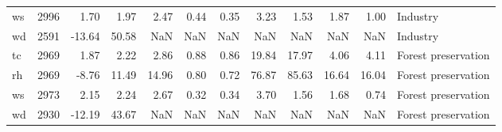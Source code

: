\begin{table}
\begin{tabular}{lrrrrrrrrrrl}
ws &   2996 &   1.70 &   1.97 &   2.47 &  0.44 &  0.35 &   3.23 &   1.53 &   1.87 &   1.00 &             Industry \\
wd &   2591 & -13.64 &  50.58 &    NaN &   NaN &   NaN &    NaN &    NaN &    NaN &    NaN &             Industry \\
tc &   2969 &   1.87 &   2.22 &   2.86 &  0.88 &  0.86 &  19.84 &  17.97 &   4.06 &   4.11 &  Forest preservation \\
rh &   2969 &  -8.76 &  11.49 &  14.96 &  0.80 &  0.72 &  76.87 &  85.63 &  16.64 &  16.04 &  Forest preservation \\
ws &   2973 &   2.15 &   2.24 &   2.67 &  0.32 &  0.34 &   3.70 &   1.56 &   1.68 &   0.74 &  Forest preservation \\
wd &   2930 & -12.19 &  43.67 &    NaN &   NaN &   NaN &    NaN &    NaN &    NaN &    NaN &  Forest preservation \\
\bottomrule
\end{tabular}
\end{table}

